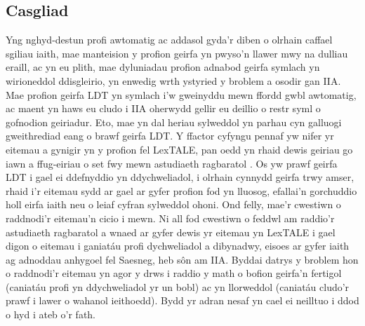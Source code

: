 \subsection{Casgliad}
Yng nghyd-destun profi awtomatig ac addasol gyda'r diben o olrhain caffael sgiliau iaith, mae manteision y profion geirfa yn pwyso'n llawer mwy na dulliau eraill, ac yn eu plith, mae dyluniadau profion adnabod geirfa symlach yn wirioneddol ddisgleirio, yn enwedig wrth ystyried y broblem a osodir gan IIA\@. Mae profion geirfa LDT yn symlach i'w gweinyddu mewn ffordd gwbl awtomatig, ac maent yn haws eu cludo i IIA oherwydd gellir eu deillio o restr syml o gofnodion geiriadur. Eto, mae yn dal heriau sylweddol yn parhau cyn galluogi gweithrediad eang o brawf geirfa LDT\@. Y ffactor cyfyngu pennaf yw nifer yr eitemau a gynigir yn y profion fel LexTALE, pan oedd yn rhaid dewis geiriau go iawn a ffug-eiriau o set fwy mewn astudiaeth ragbaratol \parencite{lemhofer_introducing_2012}. Os yw prawf geirfa LDT i gael ei ddefnyddio yn ddychweliadol, i olrhain cynnydd geirfa trwy amser, rhaid i'r eitemau sydd ar gael ar gyfer profion fod yn lluosog, efallai'n gorchuddio holl eirfa iaith neu o leiaf cyfran sylweddol ohoni. Ond felly, mae'r cwestiwn o raddnodi'r eitemau'n cicio i mewn. Ni all fod cwestiwn o feddwl am raddio'r astudiaeth ragbaratol a wnaed ar gyfer dewis yr eitemau yn LexTALE i gael digon o eitemau i ganiatáu profi dychweliadol a dibynadwy, eisoes ar gyfer iaith ag adnoddau anhygoel fel Saesneg, heb sôn am IIA\@. Byddai datrys y broblem hon o raddnodi'r eitemau yn agor y drws i raddio y math o bofion geirfa'n fertigol (caniatáu profi yn ddychweliadol yr un bobl) ac yn llorweddol (caniatáu cludo'r prawf i lawer o wahanol ieithoedd). Bydd yr adran nesaf yn cael ei neilltuo i ddod o hyd i ateb o'r fath.

